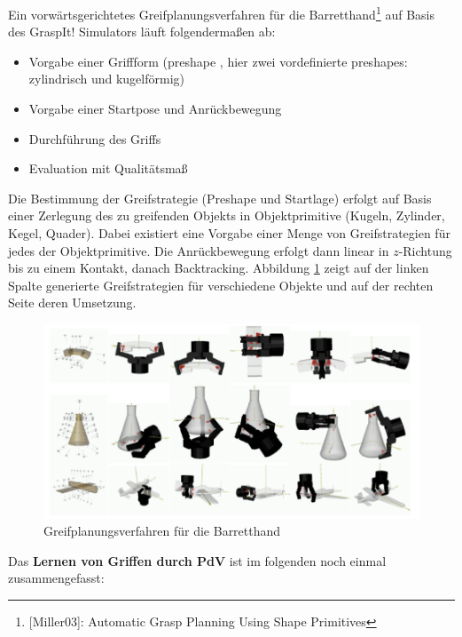 Ein vorwärtsgerichtetes Greifplanungsverfahren für die Barretthand\footnote{[Miller03]: Automatic Grasp Planning Using Shape Primitives} auf Basis des GraspIt! Simulators läuft folgendermaßen ab:
\begin{itemize}
\item Vorgabe einer Griffform (\Gu preshape \Go, hier zwei vordefinierte preshapes: zylindrisch und kugelförmig)
\item Vorgabe einer Startpose und Anrückbewegung
\item Durchführung des Griffs
\item Evaluation mit Qualitätsmaß
\end{itemize}
Die Bestimmung der Greifstrategie (Preshape und Startlage) erfolgt auf Basis einer Zerlegung des zu greifenden Objekts in Objektprimitive (Kugeln, Zylinder, Kegel, Quader). Dabei existiert eine Vorgabe einer Menge von Greifstrategien für jedes der Objektprimitive. Die Anrückbewegung erfolgt dann linear in $z$-Richtung bis zu einem Kontakt, danach Backtracking. Abbildung \ref{fig:ch04_griffe} zeigt auf der linken Spalte generierte Greifstrategien für verschiedene Objekte und auf der rechten Seite deren Umsetzung.
\begin{figure}[ht]\centering 
\includegraphics[width=0.5\linewidth]{figures/ch04_griffe.png}
\caption{Greifplanungsverfahren für die Barretthand}
\label{fig:ch04_griffe}
\end{figure}
\newpage
Das \textbf{Lernen von Griffen durch PdV} ist im folgenden noch einmal zusammengefasst:
